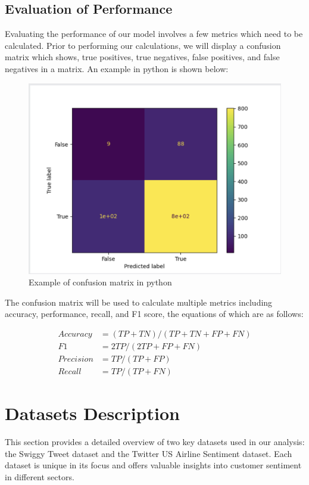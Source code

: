 \documentclass[conference]{IEEEtran}
\begin{document}
\subsection{Evaluation of Performance}
Evaluating the performance of our model involves a few metrics which need to be calculated. 
Prior to performing our calculations, we will display a confusion matrix which shows, true positives, true negatives, false positives, and false negatives in a matrix. 
An example in python is shown below:


\begin{figure}[b]
    \includegraphics[width=0.5 \textwidth]{confusion_matrix.png}
    \caption{Example of confusion matrix in python\cite{b16}}    
\end{figure}
The confusion matrix will be used to calculate multiple metrics including accuracy, performance, recall, and F1 score, the equations of which are as follows:

\begin{align}
    Accuracy &= (TP + TN) / (TP + TN + FP + FN)\\
    F1 &= 2TP / (2TP + FP + FN)\\
    Precision &= TP / (TP + FP)\\
    Recall &= TP / (TP + FN)
\end{align}

\section{Datasets Description}
This section provides a detailed overview of two key datasets used in our analysis: the Swiggy Tweet dataset and the Twitter US Airline Sentiment dataset. 
Each dataset is unique in its focus and offers valuable insights into customer sentiment in different sectors.
\end{document}
